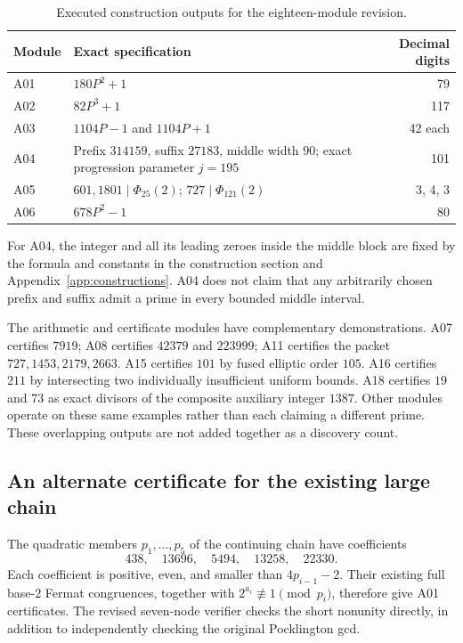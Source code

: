 \documentclass[11pt,a4paper]{article}
\theoremstyle{definition}\newtheorem{definition}[theorem]{Definition}
\theoremstyle{remark}\newtheorem{remark}[theorem]{Remark}
\begin{document}
\begin{table}[htbp]\centering\small
\caption{Executed construction outputs for the eighteen-module revision.}
\label{tab:revision-constructions}
\begin{tabularx}{\textwidth}{@{}lXr@{}}
\toprule
Module & Exact specification & Decimal digits\\
\midrule
A01 & $180P^2+1$ & 79\\
A02 & $82P^3+1$ & 117\\
A03 & $1104P-1$ and $1104P+1$ & 42 each\\
A04 & Prefix $314159$, suffix $27183$, middle width $90$;
exact progression parameter $j=195$ & 101\\
A05 & $601,1801\mid\Phi_{25}(2)$; $727\mid\Phi_{121}(2)$ & 3, 4, 3\\
A06 & $678P^2-1$ & 80\\
\bottomrule
\end{tabularx}
\end{table}

For A04, the integer and all its leading zeroes inside the middle block
are fixed by the formula and constants in the construction section and
Appendix~\ref{app:constructions}. A04 does not claim that any arbitrarily
chosen prefix and suffix admit a prime in every bounded middle interval.

The arithmetic and certificate modules have complementary demonstrations.
A07 certifies $7919$; A08 certifies $42379$ and $223999$; A11 certifies the
packet $727,1453,2179,2663$. A15 certifies $101$ by fused elliptic order
$105$. A16 certifies $211$ by intersecting two individually insufficient
uniform bounds. A18 certifies $19$ and $73$ as exact divisors of the
composite auxiliary integer $1387$. Other modules operate on these same
examples rather than each claiming a different prime. These overlapping
outputs are not added together as a discovery count.

\subsection{An alternate certificate for the existing large chain}
\label{sec:alternate-chain}

The quadratic members $p_1,\ldots,p_5$ of the continuing chain have
coefficients
\[
 438,\quad13696,\quad5494,\quad13258,\quad22330.
\]
Each coefficient is positive, even, and smaller than $4p_{i-1}-2$.
Their existing full base-$2$ Fermat congruences, together with
$2^{a_i}\not\equiv1\pmod{p_i}$, therefore give A01 certificates.
The revised seven-node verifier checks the short nonunity directly, in
addition to independently checking the original Pocklington gcd.
\end{document}
